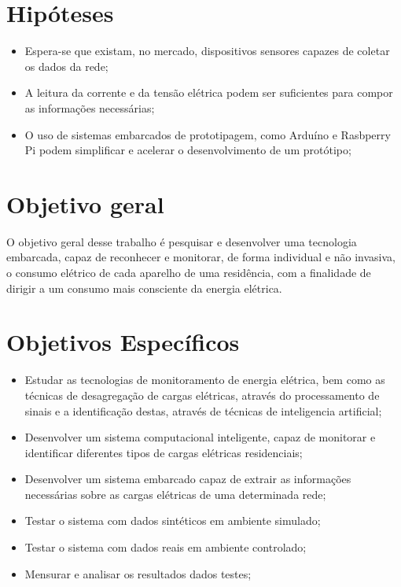 \section{Hipóteses}

\begin{itemize}
    \item Espera-se que existam, no mercado, dispositivos sensores capazes de coletar os dados da rede;
    \item A leitura da corrente e da tensão elétrica podem ser suficientes para compor as informações necessárias;
    \item O uso de sistemas embarcados de prototipagem, como Arduíno e Rasbperry Pi podem simplificar e acelerar o desenvolvimento de um protótipo;
\end{itemize}


\section{Objetivo geral}

O objetivo geral desse trabalho é pesquisar e desenvolver uma tecnologia embarcada, capaz de reconhecer e monitorar, de forma individual e não invasiva, o consumo elétrico de cada aparelho de uma residência, com a finalidade de dirigir a um consumo mais consciente da energia elétrica.

\section{Objetivos Específicos}
\begin{itemize}
    \item Estudar as tecnologias de monitoramento de energia elétrica, bem como as técnicas de desagregação de cargas elétricas, através do processamento de sinais e a identificação destas, através de técnicas de inteligencia artificial;
    \item Desenvolver um sistema computacional inteligente, capaz de monitorar e identificar diferentes tipos de cargas elétricas residenciais;
    \item Desenvolver um sistema embarcado capaz de extrair as informações necessárias sobre as cargas elétricas de uma determinada rede;
    \item Testar o sistema com dados sintéticos em ambiente simulado;
    \item Testar o sistema com dados reais em ambiente controlado;
    \item Mensurar e analisar os resultados dados testes;
\end{itemize}

